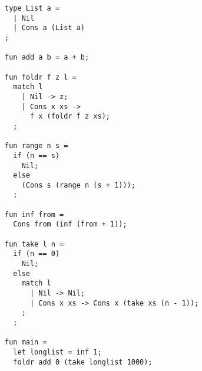 \begin{figure}
\begin{lstlisting}[breaklines=true,caption={foldr},label=lst:appendix:foldr]
type List a = 
  | Nil
  | Cons a (List a)
;

fun add a b = a + b;

fun foldr f z l =
  match l
    | Nil -> z;
    | Cons x xs ->
      f x (foldr f z xs);
  ;

fun range n s =
  if (n == s) 
    Nil;
  else
    (Cons s (range n (s + 1)));
  ;

fun inf from =
  Cons from (inf (from + 1));

fun take l n =
  if (n == 0) 
    Nil;
  else
    match l
      | Nil -> Nil;
      | Cons x xs -> Cons x (take xs (n - 1));
    ;
  ;

fun main =
  let longlist = inf 1;
  foldr add 0 (take longlist 1000);

\end{lstlisting}
\end{figure}
